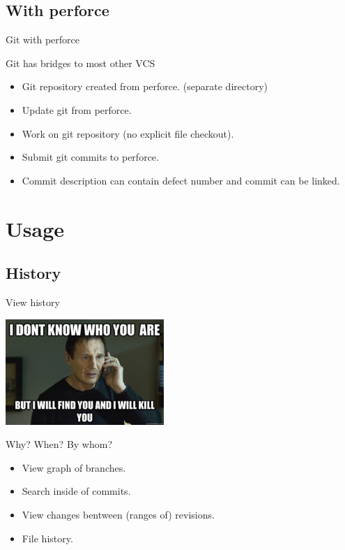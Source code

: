 \documentclass{beamer}
\begin{document}

\subsection{With perforce}

\begin{frame}{Git with perforce}

\begin{block}{Git has bridges to most other VCS}
\begin{itemize}
 \item Git repository created from perforce. (separate directory)
 \item Update git from perforce.
 \item Work on git repository (no explicit file checkout).
 \item Submit git commits to perforce.
 \item Commit description can contain defect number and commit can be linked.
\end{itemize}
\end{block}

\end{frame}


\section{Usage}

\subsection{History}

\begin{frame}{View history}

\begin{center}
 \includegraphics[height=4cm]{taken.jpg}
\end{center}

\begin{block}{Why? When? By whom?}
\begin{itemize}
 \item View graph of branches.
 \item Search inside of commits.
 \item View changes bentween (ranges of) revisions.
 \item File history.
\end{itemize}
\end{block}

\end{frame}
\end{document}
